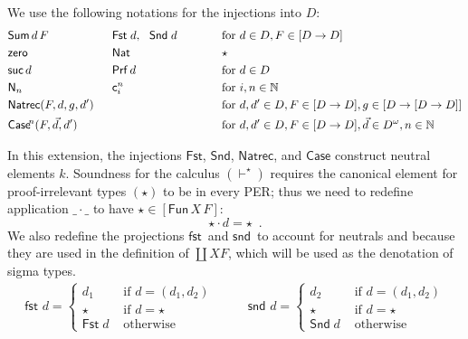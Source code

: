 \documentclass{LMCS}
\theoremstyle{plain}\newtheorem{satz}[thm]{Satz}
\newcommand{\LONGVERSION}[1]{#1}
\newcommand{\tfst}{\mathsf{fst}}
\newcommand{\tsnd}{\mathsf{snd}}
\newcommand{\into}{\rightarrow}
\newcommand{\natty}{\mathsf{Nat}}
\newcommand{\ztm}{\mathsf{zero}}
\newcommand{\vdashp}{\vdash^{\oprf}}\newcommand{\sdctx}[1]{#1\vdashp}
\newcommand{\iPi}[2]{\mathsf{Fun}\,#1\,#2}
\newcommand{\iDs}[2]{\mathsf{Sum}\,#1\,#2}
\newcommand{\Fst}{\mathsf{Fst}}
\newcommand{\Snd}{\mathsf{Snd}}
\newcommand{\iBoolF}[1]{\Fst\;#1}
\newcommand{\iBoolT}[1]{\Snd\;#1}
\newcommand{\fstnew}{\tfst\,}\newcommand{\sndnew}{\tsnd\,}
\newcommand{\oprf}{\dprf}
\newcommand{\dprf}{\star}
\newcommand{\prf}[1]{\mathsf{Prf}\,#1}
\newcommand{\Elimraw}{\mathsf{Case}}
\newcommand{\constD}[2]{\mathsf{c}^{#1}_{#2}}
\newcommand{\elimD}[4]{\Elimraw\!^{#1}(#2, #3, #4)}
\newcommand{\enumD}[1]{\mathsf{N}_{#1}}
\newcommand{\iZero}{\ztm}
\newcommand{\iNat}{\natty}
\newcommand{\Nrecraw}{\mathsf{Natrec}}
\newcommand{\iNrec}[4]{\Nrecraw(#1,#2,#3,#4)}
\newcommand{\iSuc}[1]{\mathsf{suc}\,#1}
\newcommand{\LONGVERSION}[1]{}
\begin{document}
\LONGVERSION{
\noindent
We use the following notations for the injections into $D$:
\begin{align*}
  & \iDs{d}{F} &\mbox{\hspace{.2cm}}
  & \Fst\;d, ~~ \Snd\;d &
  \mbox{\hspace{1cm}}&\mbox{for } d\in D, F \in [D \into D]
\\
  & \iZero & \mbox{\hspace{.2cm}} 
  & \iNat&  \mbox{\hspace{1cm}}& \dprf\\
  & \iSuc{d}& \mbox{\hspace{.2cm}} 
  &\prf{d} & \mbox{\hspace{1cm}}& \mbox{for } d \in D\\
  &\enumD{n} & \mbox{\hspace{.2cm}}
  &\constD{n}{i} & 
  \mbox{\hspace{1cm}}&\mbox{for } i,n \in \mathbb{N}\\
  &\iNrec{F}{d}{g}{d'} & \mbox{\hspace{.2cm}}&{ } &
  \mbox{\hspace{1cm}}&\mbox{for } d, d' \in D, F\in [D \into D], g\in [D \into [D \into D]] \\
  &\elimD{n}{F}{\vec{d}}{d'} &  \mbox{\hspace{.2cm}}&{ } &
  \mbox{\hspace{1cm}}&\mbox{for } d, d' \in D,F\in [D\into D],
  \vec{d} \in D^\omega, n\in \mathbb{N}
\end{align*}

\noindent
In this extension, the injections $\Fst$, $\Snd$, $\Nrecraw$, and
$\Elimraw$ construct neutral elements $k$. Soundness for the calculus
$(\vdashp)$ requires the canonical element for proof-irrelevant types
$(\dprf)$ to be in every PER; thus we need to redefine application
$\_\cdot\_$ to have $\dprf\in [\iPi{X}{F}]$:
\[ \dprf \cdot d = \dprf \enspace. \] We also redefine the projections
$\fstnew$ and $\sndnew$ to account for neutrals and because they are
used in the definition of $\coprod{X}{F}$, which will be used as the denotation
of sigma types.
\[
\begin{array}{lll}
  \fstnew\,d =
  \begin{cases}
    d_1 &\mbox{ if } d=(d_1,d_2) \\
    \dprf&\mbox{ if } d=\dprf \\
    \iBoolF{d}&\mbox{ otherwise}
  \end{cases}
&\quad &
  \sndnew\,d = \begin{cases}
    d_2 &\mbox{ if } d=(d_1,d_2) \\
    \dprf&\mbox{ if } d=\dprf \\
    \iBoolT{d}&\mbox{ otherwise}
  \end{cases}
\end{array}
\] 

}
\end{document}

